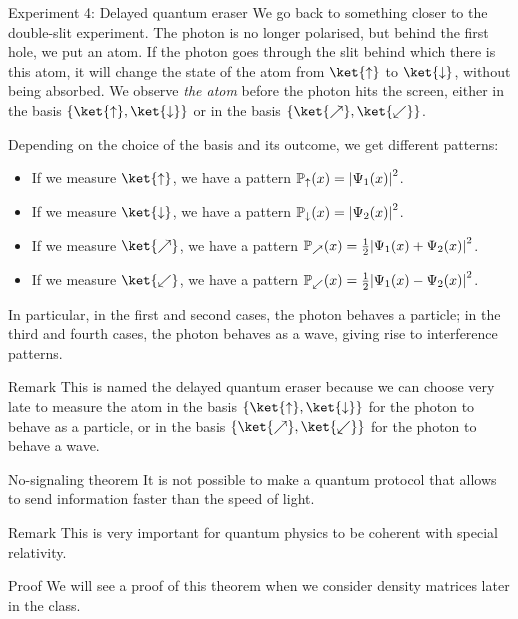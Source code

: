 \documentclass[a4paper]{article}
\begin{document}
\begin{parag}{Experiment 4: Delayed quantum eraser}
    We go back to something closer to the double-slit experiment. The photon is no longer polarised, but behind the first hole, we put an atom. If the photon goes through the slit behind which there is this atom, it will change the state of the atom from $\ket{\uparrow}$ to $\ket{\downarrow}$, without being absorbed. We observe \emph{the atom} before the photon hits the screen, either in the basis $\left\{\ket{\uparrow}, \ket{\downarrow}\right\}$ or in the basis $\left\{\ket{\nearrow}, \ket{\swarrow}\right\}$.


    Depending on the choice of the basis and its outcome, we get different patterns:
    \begin{itemize}
        \item If we measure $\ket{\uparrow}$, we have a pattern $\prob_{\uparrow}\left(x\right) = \left|\Psi_1\left(x\right)\right|^2$.
        \item If we measure $\ket{\downarrow}$, we have a pattern $\prob_{\downarrow}\left(x\right) = \left|\Psi_2\left(x\right)\right|^2$.
        \item If we measure $\ket{\nearrow}$, we have a pattern $\prob_{\nearrow}\left(x\right) = \frac{1}{2} \left|\Psi_1\left(x\right) + \Psi_2\left(x\right)\right|^2$.
        \item If we measure $\ket{\swarrow}$, we have a pattern $\prob_{\swarrow}\left(x\right) = \frac{1}{2} \left|\Psi_1\left(x\right) - \Psi_2\left(x\right)\right|^2$.
    \end{itemize}

    In particular, in the first and second cases, the photon behaves a particle; in the third and fourth cases, the photon behaves as a wave, giving rise to interference patterns. 

    \begin{subparag}{Remark}
        This is named the delayed quantum eraser because we can choose very late to measure the atom in the basis $\left\{\ket{\uparrow}, \ket{\downarrow}\right\}$ for the photon to behave as a particle, or in the basis $\left\{\ket{\nearrow}, \ket{\swarrow}\right\}$ for the photon to behave a wave.
    \end{subparag}
\end{parag}

\begin{parag}{No-signaling theorem}
    It is not possible to make a quantum protocol that allows to send information faster than the speed of light.

    \begin{subparag}{Remark}
        This is very important for quantum physics to be coherent with special relativity.
    \end{subparag}

    \begin{subparag}{Proof}
        We will see a proof of this theorem when we consider density matrices later in the class. 
    \end{subparag}
\end{parag}
\end{document}

